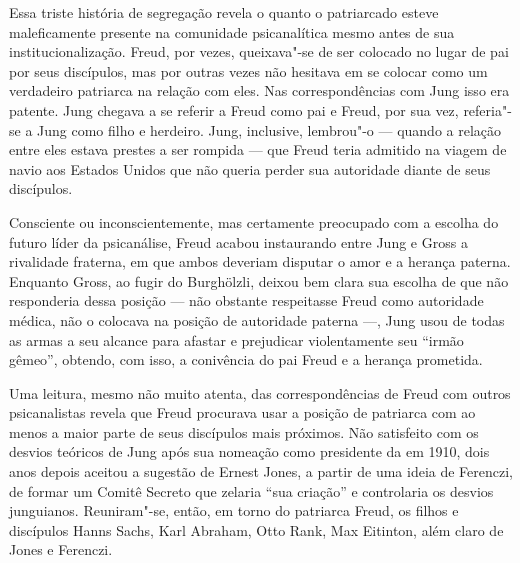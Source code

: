 Essa triste história de segregação revela o quanto o patriarcado esteve
maleficamente presente na comunidade psicanalítica mesmo antes de sua
institucionalização. Freud, por vezes, queixava"-se de ser colocado no
lugar de pai por seus discípulos, mas por outras vezes não hesitava em
se colocar como um verdadeiro patriarca na relação com eles. Nas
correspondências com Jung isso era patente. Jung chegava a se referir a
Freud como pai e Freud, por sua vez, referia"-se a Jung como filho e
herdeiro. Jung, inclusive, lembrou"-o --- quando a relação entre eles
estava prestes a ser rompida --- que Freud teria admitido na viagem de
navio aos Estados Unidos que não queria perder sua autoridade diante de
seus discípulos.

Consciente ou inconscientemente, mas certamente preocupado com a escolha
do futuro líder da psicanálise, Freud acabou instaurando entre Jung e
Gross a rivalidade fraterna, em que ambos deveriam disputar o amor e a
herança paterna. Enquanto Gross, ao fugir do Burghölzli, deixou bem
clara sua escolha de que não responderia dessa posição --- não obstante
respeitasse Freud como autoridade médica, não o colocava na posição de
autoridade paterna ---, Jung usou de todas as armas a seu alcance para
afastar e prejudicar violentamente seu ``irmão gêmeo'', obtendo, com
isso, a conivência do pai Freud e a herança prometida.

Uma leitura, mesmo não muito atenta, das correspondências de Freud com
outros psicanalistas revela que Freud procurava usar a posição de
patriarca com ao menos a maior parte de seus discípulos mais próximos.
Não satisfeito com os desvios teóricos de Jung após sua nomeação como
presidente da  em 1910, dois anos depois aceitou a sugestão de Ernest
Jones, a partir de uma ideia de Ferenczi, de formar um Comitê Secreto
que zelaria ``sua criação'' e controlaria os desvios junguianos.
Reuniram"-se, então, em torno do patriarca Freud, os filhos e discípulos
Hanns Sachs, Karl Abraham, Otto Rank, Max Eitinton, além claro de Jones
e Ferenczi.

